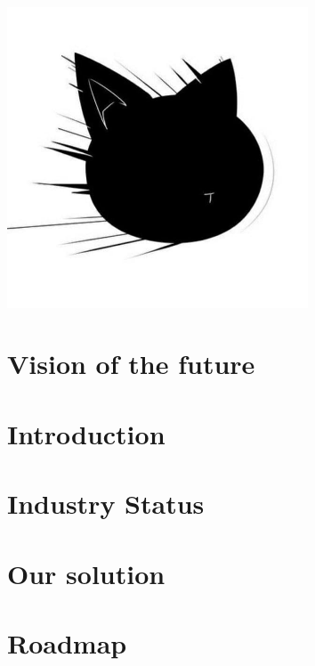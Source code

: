 \documentclass[12pt,a4paper]{article}
\begin{document}

    \tableofcontents
    \vspace*{\fill}
    \begin{center}
        \includegraphics[width=0.67\textwidth]{assets/img197}
    \end{center}
    \clearpage



    \section{Vision of the future}\label{sec:goal}
    


    \section{Introduction}\label{sec:intro}
    


    \section{Industry Status}\label{sec:now}
    


    \section{Our solution}\label{sec:solution}
    


    \section{Roadmap}\label{sec:roadmap}
    
\end{document}

